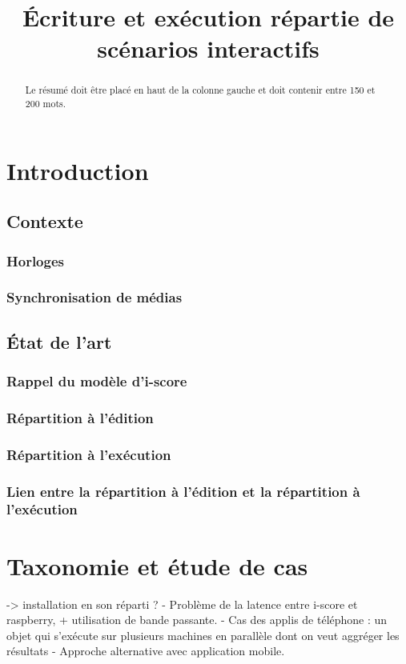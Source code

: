 \documentclass{article}
\title{Écriture et exécution répartie de scénarios interactifs}
\begin{document}
\maketitle
\begin{abstract}
Le résumé doit être placé en haut de la colonne gauche et doit contenir entre 150 et 200 mots.
\end{abstract}
\section{Introduction}
\subsection{Contexte}

\subsubsection{Horloges}
\subsubsection{Synchronisation de médias}
\subsection{État de l'art}
\subsubsection{Rappel du modèle d'i-score}
\subsubsection{Répartition à l'édition}
\subsubsection{Répartition à l'exécution}
\subsubsection{Lien entre la répartition à l'édition et la répartition à l'exécution}

\section{Taxonomie et étude de cas}
-> installation en son réparti ?
- Problème de la latence entre i-score et raspberry, + utilisation de bande passante.
- Cas des applis de téléphone : un objet qui s'exécute sur plusieurs machines en parallèle dont on veut aggréger les résultats
- Approche alternative avec application mobile.
\end{document}
